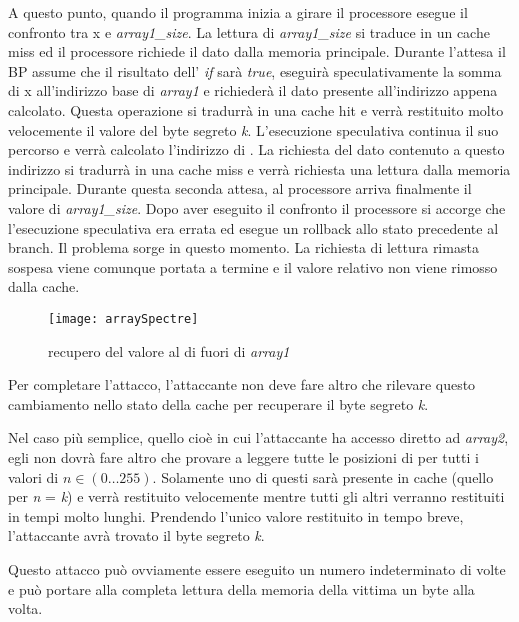 			A questo punto, quando il programma inizia a girare il processore esegue il confronto tra x e \emph{array1\_size}. La lettura di \emph{array1\_size} si traduce in un cache miss ed il processore richiede il dato dalla memoria principale. Durante l'attesa il \ac{BP} assume che il risultato dell' \emph{if} sarà \emph{true}, eseguirà speculativamente la somma di x all'indirizzo base di \emph{array1} e richiederà il dato presente all'indirizzo appena calcolato. Questa operazione si tradurrà in una cache hit e verrà restituito molto velocemente il valore del byte segreto \emph{k}. L'esecuzione speculativa continua il suo percorso e verrà calcolato l'indirizzo di . La richiesta del dato contenuto a questo indirizzo si tradurrà in una cache miss e verrà richiesta una lettura dalla memoria principale. Durante questa seconda attesa, al processore arriva finalmente il valore di \emph{array1\_size}. Dopo aver eseguito il confronto il processore si accorge che l'esecuzione speculativa era errata ed esegue un rollback allo stato precedente al branch. Il problema sorge in questo momento. La richiesta di lettura rimasta sospesa viene comunque portata a termine e il valore relativo non viene rimosso dalla cache.
			
			\begin{figure}
				\begin{center}
					\texttt{[image: arraySpectre]}
					\caption{recupero del valore al di fuori di \emph{array1}}
					\label{fig:array}
				\end{center}
			\end{figure}
			
			Per completare l'attacco, l'attaccante non deve fare altro che rilevare questo cambiamento nello stato della cache per recuperare il byte segreto \emph{k}.
			
			Nel caso più semplice, quello cioè in cui l'attaccante ha accesso diretto ad \emph{array2}, egli non dovrà fare altro che provare  a leggere tutte le posizioni di  per tutti i valori di $n \in (0\dots255)$. Solamente uno di questi sarà presente in cache (quello per \emph{n} = \emph{k}) e verrà restituito velocemente mentre tutti gli altri verranno restituiti in tempi molto lunghi. Prendendo l'unico valore restituito in tempo breve, l'attaccante avrà trovato il byte segreto \emph{k}.
			
			Questo attacco può ovviamente essere eseguito un numero indeterminato di volte e può portare alla completa lettura della memoria della vittima un byte alla volta.
			
